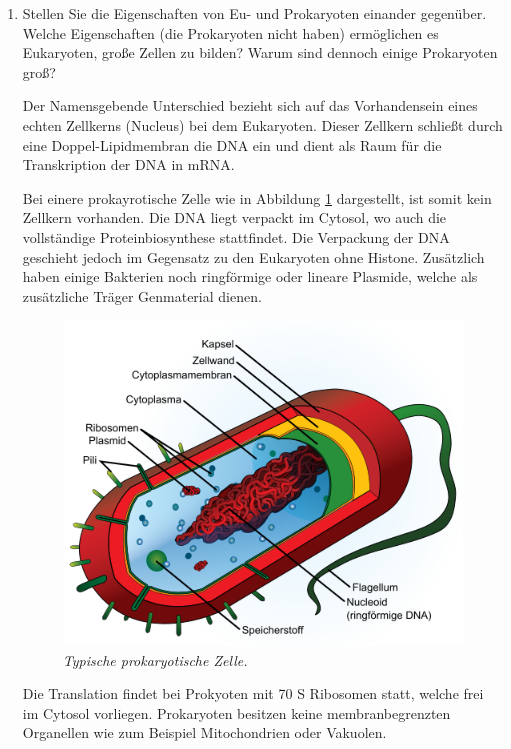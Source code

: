 \begin{enumerate}
	\item Stellen Sie die Eigenschaften von Eu- und Prokaryoten einander gegenüber. Welche Eigenschaften (die Prokaryoten nicht haben) ermöglichen es Eukaryoten, große Zellen zu bilden? Warum sind dennoch einige Prokaryoten groß?

		Der Namensgebende Unterschied bezieht sich auf das Vorhandensein eines echten Zellkerns (Nucleus) bei dem Eukaryoten.
		Dieser Zellkern schließt durch eine Doppel-Lipidmembran die DNA ein
		und dient als Raum für die Transkription der DNA in mRNA.

		Bei einere prokayrotische Zelle wie in Abbildung \ref{fig:prokarya} dargestellt,
		ist somit kein Zellkern vorhanden.
		Die DNA liegt verpackt im Cytosol,
		wo auch die vollständige Proteinbiosynthese stattfindet.
		Die Verpackung der DNA geschieht jedoch im Gegensatz zu den Eukaryoten ohne Histone.
		Zusätzlich haben einige Bakterien noch ringförmige oder lineare Plasmide,
		welche als zusätzliche Träger Genmaterial dienen.
		
		\begin{figure}[ht!]
		\leavevmode
		\begin{center}
		\includegraphics[scale=0.47]{./pictures/avg_prokaryote_cell_500}
		\end{center}
		\caption{\slshape{Typische prokaryotische Zelle.}}
		\label{fig:prokarya}
		\end{figure}

		Die Translation findet bei Prokyoten mit 70 S Ribosomen statt,
		welche frei im Cytosol vorliegen.
		Prokaryoten besitzen keine membranbegrenzten Organellen wie zum Beispiel Mitochondrien oder Vakuolen.


\end{enumerate}
